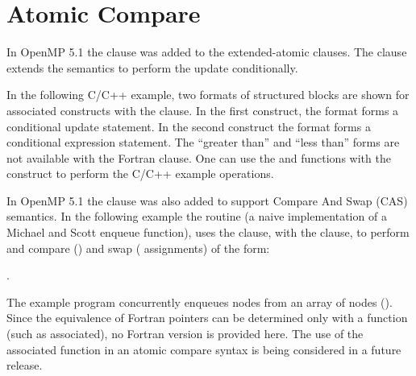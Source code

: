 \pagebreak
\section{Atomic Compare}
\label{sec:cas}


In OpenMP 5.1 the  clause was added to the extended-atomic clauses.
The  clause extends the semantics to perform the 
update conditionally. 

In the following C/C++ example, two formats of structured blocks
are shown for associated  constructs with the  clause.
In the first  construct, the format forms a conditional update statement.
In the second  construct the format forms a conditional expression statement.
The ``greater than'' and ``less than'' forms are not available with the Fortran 
clause.  One can use the  and  functions with the ~
construct to perform the C/C++ example operations.


In OpenMP 5.1 the  clause was also added to support Compare And
Swap (CAS) semantics. In the following example the  routine
(a naive implementation of a Michael and Scott enqueue function), uses the
 clause, with the  clause, to perform and compare
() and swap ( assignments) of the
form: 
\begin{description}[noitemsep,labelindent=5mm,widest=f90]
\item {}.
\end{description}
The example program concurrently enqueues nodes from an array of nodes ().
Since the equivalence of Fortran pointers can be determined only with a function (such as associated),
no Fortran version is provided here. The use of the associated function in an atomic compare syntax is
being considered in a future release.

